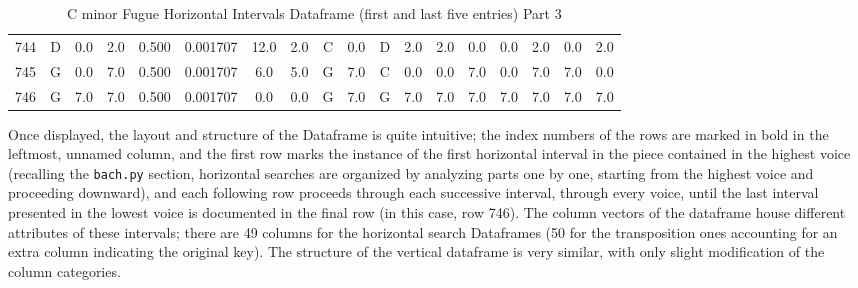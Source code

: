 \begin{table}[H]
\begin{tabular}{|lccccccccccccccccc|}
   744 & D                          & 0.0                         & 2.0                         & 0.500               & 0.001707                    & 12.0                    & 2.0                       & C                       & 0.0                        & D                     & 2.0                      & 2.0                   & 0.0                & 0.0               & 2.0               & 0.0                    & 2.0 \\
   745 & G                          & 0.0                         & 7.0                         & 0.500               & 0.001707                    & 6.0                     & 5.0                       & G                       & 7.0                        & C                     & 0.0                      & 0.0                   & 7.0                & 0.0               & 7.0               & 7.0                    & 0.0 \\
   746 & G                          & 7.0                         & 7.0                         & 0.500               & 0.001707                    & 0.0                     & 0.0                       & G                       & 7.0                        & G                     & 7.0                      & 7.0                   & 7.0                & 7.0               & 7.0               & 7.0                    & 7.0 \\
   \hline
\end{tabular}
\caption{C minor Fugue Horizontal Intervals Dataframe (first and last five entries) Part 3}
\end{table}
    Once displayed, the layout and structure of the Dataframe is quite
intuitive; the index numbers of the rows are marked in bold in the
leftmost, unnamed column, and the first row marks the instance of the
first horizontal interval in the piece contained in the highest voice
(recalling the \texttt{bach.py} section, horizontal searches are
organized by analyzing parts one by one, starting from the highest voice
and proceeding downward), and each following row proceeds through each
successive interval, through every voice, until the last interval
presented in the lowest voice is documented in the final row (in this
case, row 746). The column vectors of the dataframe house different
attributes of these intervals; there are 49 columns for the horizontal
search Dataframes (50 for the transposition ones accounting for an extra
column indicating the original key). The structure of the vertical
dataframe is very similar, with only slight modification of the column
categories.

